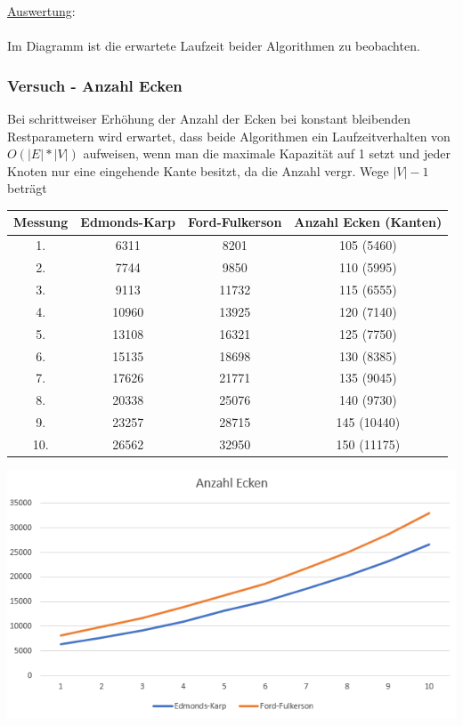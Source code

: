 \documentclass[11pt]{article}
\begin{document}
    \underline{Auswertung}:\\~\\
    Im Diagramm ist die erwartete Laufzeit beider Algorithmen zu beobachten.

    \subsubsection{Versuch - Anzahl Ecken}
    Bei schrittweiser Erh\"ohung der Anzahl der Ecken bei konstant bleibenden Restparametern wird erwartet, dass beide Algorithmen ein Laufzeitverhalten von $O(|E|*|V|)$ aufweisen, wenn man die maximale Kapazit\"at auf 1 setzt und jeder Knoten nur eine eingehende Kante besitzt, da die Anzahl vergr. Wege $|V|-1$ betr\"agt

    \begin{center}
        \begin{tabular}{c|c|c|c}
            Messung & \textbf{Edmonds-Karp} & \textbf{Ford-Fulkerson} & Anzahl Ecken (Kanten)\\
            \hline
            1. & 6311 & 8201 & 105 (5460)\\
            2. & 7744 & 9850 & 110 (5995)\\
            3. & 9113 & 11732 & 115 (6555)\\
            4. & 10960 & 13925 & 120 (7140)\\
            5. & 13108 & 16321 & 125 (7750)\\
            6. & 15135 & 18698 & 130 (8385)\\
            7. & 17626 & 21771 & 135 (9045)\\
            8. & 20338 & 25076 & 140 (9730)\\
            9. & 23257 & 28715 & 145 (10440)\\
            10. & 26562 & 32950 & 150 (11175)\\
        \end{tabular}
    \end{center}

    \begin{center}
        \includegraphics[weight=10cm]{../anzahl-kanten-graph.PNG}
    \end{center}
\end{document}
